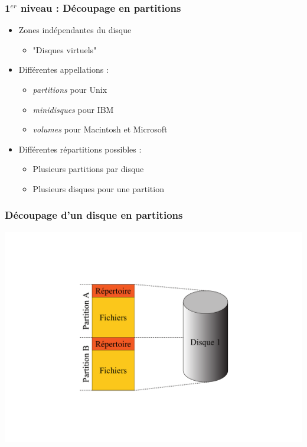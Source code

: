 \begin{frame}
\frametitle{1$^{er}$ niveau : Découpage en partitions}
\begin{itemize}
\item Zones indépendantes du disque
\begin{itemize}
\item "Disques virtuels"
\end{itemize}
\item Différentes appellations :
\begin{itemize}
\item \textit{partitions} pour Unix
\item \textit{minidisques} pour IBM
\item \textit{volumes} pour Macintosh et Microsoft
\end{itemize}
\item Différentes répartitions possibles :
\begin{itemize}
\item Plusieurs partitions par disque
\item Plusieurs disques pour une partition
\end{itemize}
\end{itemize}
\end{frame}

\begin{frame}
\frametitle{Découpage d'un disque en partitions}
\includegraphics[height=.9\textheight]{../illustration/partition_2sur1.pdf}
\end{frame}

